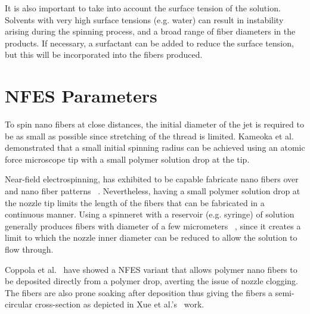 \documentclass[5p,,preprint,12pt,twocolumn]{elsarticle}
\begin{document}
It is also important to take into account the surface tension of the solution. Solvents with very high surface tensions (e.g. water) can result in instability arising during the spinning process, and a broad range of fiber diameters in the products. If necessary, a surfactant can be added to reduce the surface tension, but this will be incorporated into the fibers produced.
    
\section{NFES Parameters}
To spin nano fibers at close distances, the initial diameter of the jet is required to be as small as possible since stretching of the thread is limited. Kameoka et al.\unskip~\cite{527120:12321556} demonstrated that a small initial spinning radius can be achieved using an atomic force microscope tip with a small polymer solution drop at the tip.

Near-field electrospinning, has exhibited to be capable fabricate nano fibers over and nano fiber patterns \unskip~\cite{527120:11974321}. Nevertheless, having a small polymer solution drop at the nozzle tip limits the length of the fibers that can be fabricated in a continuous manner. Using a spinneret with a reservoir (e.g. syringe) of solution generally produces fibers with diameter of a few micrometers \unskip~\cite{527120:11974310,527120:11974326}, since it creates a limit to which the nozzle inner diameter can be reduced to allow the solution to flow through.

Coppola et al.\unskip~\cite{527120:11974307} have showed a NFES variant that allows polymer nano fibers to be deposited directly from a polymer drop, averting the issue of nozzle clogging. The fibers are also prone soaking after deposition thus giving the fibers a semi-circular cross-section as depicted in Xue et al.'s\unskip~\cite{527120:11974326} work. 
\end{document}

